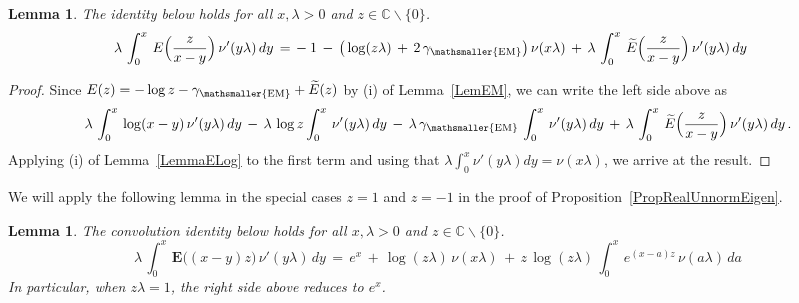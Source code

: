 \documentclass[10pt]{article}
\numberwithin{equation}{section}
\newtheorem{lemma}[theorem]{Lemma}
\theoremstyle{definition}
\newcommand{\C}{{\mathbb C}}
\begin{document}
\begin{lemma}\label{LemmaUpsilon} The identity below holds for all $x,\lambda>0$ and $z\in \C\backslash \{0\}$.
\begin{align*}
\lambda\, \int_0^{x} \,E \Big(\frac{z}{x-y}\Big)\,\nu'( y\lambda)\,dy\,=\,& -1\, -\,\big(\log ( z \lambda)\,+\,2\,\gamma_{\mathsmaller{\textup{EM}}}\big) \,\nu(x \lambda )\,+\,\lambda \,\int_0^{x} \,\widetilde{E} \Big(\frac{z}{x-y}\Big)\, \nu'( y \lambda)\,dy 
\end{align*}


\end{lemma}
\begin{proof}  Since $E(z)=-\log z-\gamma_{\mathsmaller{\textup{EM}}}+\widetilde{E}(z)  $ by (i) of Lemma~\ref{LemEM}, we can write the left side  above as 
\begin{align*} \lambda \,\int_0^{x}\,\log(x-y)\, \nu'( y\lambda)\,dy \, - \,\lambda\,\log z \int_0^{x}  \,\nu'( y\lambda)\,dy 
\, - \,\lambda\,\gamma_{\mathsmaller{\textup{EM}}} \, \int_0^{x}\,\nu'( y\lambda)\,dy  \,+\,\lambda \,\int_0^{x}\,\widetilde{E} \Big(\frac{z}{x-y}\Big)\, \nu'( y\lambda) \,dy \,.
\end{align*}
 Applying  (i) of Lemma~\ref{LemmaELog} to the first term   and using that $\lambda\int_0^{x} \nu'( y \lambda)dy=\nu(x \lambda)$, we arrive at the result. 
\end{proof}


We will  apply the following lemma  in the special cases $z=1$ and $z=-1$ in the proof of Proposition~\ref{PropRealUnnormEigen}.
\begin{lemma}\label{LemmaEUpsilonBold} The convolution identity below  holds for all $x,\lambda>0$ and $z\in \C\backslash \{0\}  $.
$$ \lambda\,\int_0^{x} \,\boldsymbol{E}\big((x-y)z\big) \, \nu'( y \lambda)\,dy\,=\,e^x\,+\,\log( z\lambda)\,\nu( x \lambda)\,+\,z\,\log( z\lambda) \,\int_0^x\, e^{(x-a)z}\,\nu(a \lambda  )\,da $$
In particular, when $z\lambda =1$, the right side above reduces to $e^x$.
\end{lemma}
\end{document}
